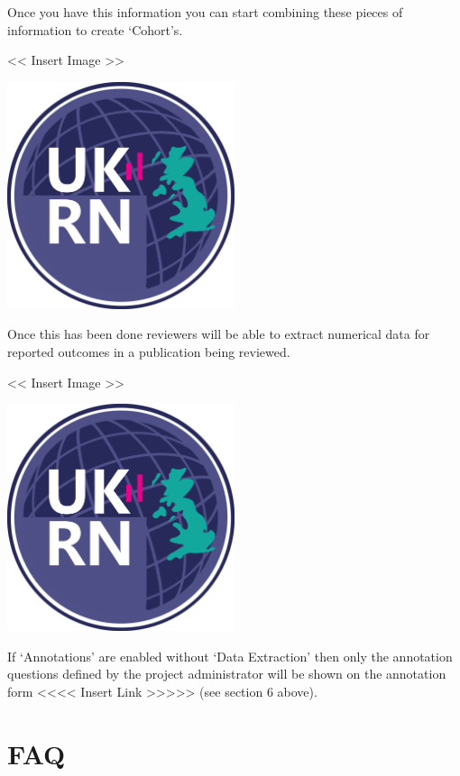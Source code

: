 \documentclass[]{book}
\begin{document}
Once you have this information you can start combining these pieces of
information to create `Cohort's.

\textless{}\textless{} Insert Image \textgreater{}\textgreater{}

\includegraphics[width=0.50000\textwidth,height=0.50000\textwidth]{figs/evidence-triangle.png}

Once this has been done reviewers will be able to extract numerical data
for reported outcomes in a publication being reviewed.

\textless{}\textless{} Insert Image \textgreater{}\textgreater{}

\includegraphics[width=0.50000\textwidth,height=0.50000\textwidth]{figs/evidence-triangle.png}

If `Annotations' are enabled without `Data Extraction' then only the
annotation questions defined by the project administrator will be shown
on the annotation form \textless{}\textless{}\textless{}\textless{}
Insert Link
\textgreater{}\textgreater{}\textgreater{}\textgreater{}\textgreater{}
(see section 6 above).

\chapter{FAQ}\label{faq}
\end{document}
